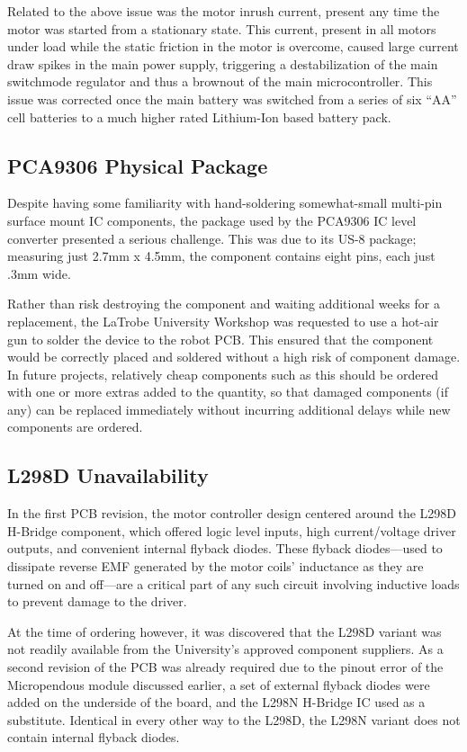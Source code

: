 Related to the above issue was the motor inrush current, present any time the motor was started from a stationary state. This current, present in all motors under load while the static friction in the motor is overcome, caused large current draw spikes in the main power supply, triggering a destabilization of the main switchmode regulator and thus a brownout of the main microcontroller. This issue was corrected once the main battery was switched from a series of six ``AA'' cell batteries to a much higher rated Lithium-Ion based battery pack.

\FloatBarrier
\subsection{PCA9306 Physical Package}

Despite having some familiarity with hand-soldering somewhat-small multi-pin surface mount IC components, the package used by the PCA9306 IC level converter presented a serious challenge. This was due to its US-8 package; measuring just 2.7mm x 4.5mm, the component contains eight pins, each just .3mm wide.

Rather than risk destroying the component and waiting additional weeks for a replacement, the LaTrobe University Workshop was requested to use a hot-air gun to solder the device to the robot PCB. This ensured that the component would be correctly placed and soldered without a high risk of component damage. In future projects, relatively cheap components such as this should be ordered with one or more extras added to the quantity, so that damaged components (if any) can be replaced immediately without incurring additional delays while new components are ordered. 

\FloatBarrier
\subsection{L298D Unavailability}

In the first PCB revision, the motor controller design centered around the L298D H-Bridge component, which offered logic level inputs, high current/voltage driver outputs, and convenient internal flyback diodes. These flyback diodes---used to dissipate reverse EMF generated by the motor coils' inductance as they are turned on and off---are a critical part of any such circuit involving inductive loads to prevent damage to the driver.

At the time of ordering however, it was discovered that the L298D variant was not readily available from the University's approved component suppliers. As a second revision of the PCB was already required due to the pinout error of the Micropendous module discussed earlier, a set of external flyback diodes were added on the underside of the board, and the L298N H-Bridge IC used as a substitute. Identical in every other way to the L298D, the L298N variant does not contain internal flyback diodes.

